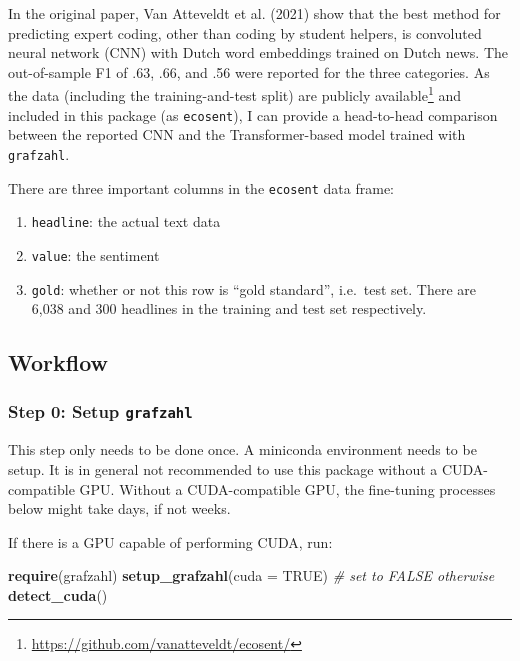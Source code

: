 \documentclass[
  english,
  man,floatsintext]{apa7}
\newenvironment{Shaded}{\begin{snugshade}}{\end{snugshade}}
\newcommand{\CommentTok}[1]{\textcolor[rgb]{0.56,0.35,0.01}{\textit{#1}}}
\newcommand{\DataTypeTok}[1]{\textcolor[rgb]{0.13,0.29,0.53}{#1}}
\newcommand{\KeywordTok}[1]{\textcolor[rgb]{0.13,0.29,0.53}{\textbf{#1}}}
\newcommand{\NormalTok}[1]{#1}
\newcommand{\OtherTok}[1]{\textcolor[rgb]{0.56,0.35,0.01}{#1}}
\providecommand{\tightlist}{%
  \setlength{\itemsep}{0pt}\setlength{\parskip}{0pt}}
\begin{document}
In the original paper, Van Atteveldt et al. (2021) show that the best method for predicting expert coding, other than coding by student helpers, is convoluted neural network (CNN) with Dutch word embeddings trained on Dutch news. The out-of-sample F1 of .63, .66, and .56 were reported for the three categories. As the data (including the training-and-test split) are publicly available\footnote{\url{https://github.com/vanatteveldt/ecosent/}} and included in this package (as \texttt{ecosent}), I can provide a head-to-head comparison between the reported CNN and the Transformer-based model trained with \texttt{grafzahl}.

There are three important columns in the \texttt{ecosent} data frame:

\begin{enumerate}
\def\labelenumi{\arabic{enumi}.}
\tightlist
\item
  \texttt{headline}: the actual text data
\item
  \texttt{value}: the sentiment
\item
  \texttt{gold}: whether or not this row is ``gold standard'', i.e.~test set. There are 6,038 and 300 headlines in the training and test set respectively.
\end{enumerate}

\hypertarget{workflow}{%
\subsection{Workflow}\label{workflow}}

\hypertarget{step-0-setup-grafzahl}{%
\subsubsection{\texorpdfstring{Step 0: Setup \texttt{grafzahl}}{Step 0: Setup grafzahl}}\label{step-0-setup-grafzahl}}

This step only needs to be done once. A miniconda environment needs to be setup. It is in general not recommended to use this package without a CUDA-compatible GPU. Without a CUDA-compatible GPU, the fine-tuning processes below might take days, if not weeks.

If there is a GPU capable of performing CUDA, run:

\begin{Shaded}
\begin{Highlighting}[]
\KeywordTok{require}\NormalTok{(grafzahl)}
\KeywordTok{setup\_grafzahl}\NormalTok{(}\DataTypeTok{cuda =} \OtherTok{TRUE}\NormalTok{) }\CommentTok{\# set to FALSE otherwise}
\KeywordTok{detect\_cuda}\NormalTok{()}
\end{Highlighting}
\end{Shaded}
\end{document}
